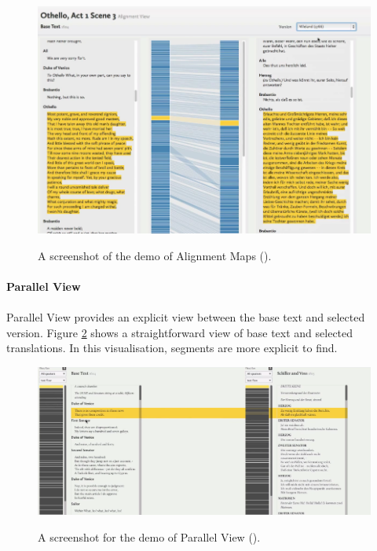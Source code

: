 \begin{figure}[H] 
	\centering    
	\includegraphics[scale=0.7]{Figs/Alignment-Map}\\[1ex]
	\caption{A screenshot of the demo of Alignment Maps (\cite{Cheesman2012}).}
	\label{fig:alignmentMap}
\end{figure} 

\paragraph{Parallel View}
\paragraph[]{}

Parallel View provides an explicit view between the base text and selected version. Figure \ref{fig:parallelView} shows a straightforward view of base text and selected translations.  In this visualisation, segments are more explicit to find.

\begin{figure}[H] 
	\centering    
	\includegraphics[scale=0.6]{Figs/Parallel-View}\\[1ex]
	\caption{A screenshot for the demo of Parallel View (\cite{Cheesman2012}).}
	\label{fig:parallelView}
\end{figure} 

